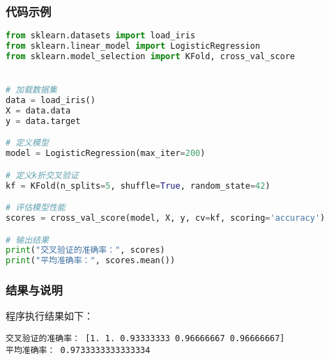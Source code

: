 \subsubsection{代码示例}
\begin{lstlisting}[language=python]
from sklearn.datasets import load_iris
from sklearn.linear_model import LogisticRegression
from sklearn.model_selection import KFold, cross_val_score


# 加载数据集
data = load_iris()
X = data.data
y = data.target

# 定义模型
model = LogisticRegression(max_iter=200)

# 定义k折交叉验证
kf = KFold(n_splits=5, shuffle=True, random_state=42)

# 评估模型性能
scores = cross_val_score(model, X, y, cv=kf, scoring='accuracy')

# 输出结果
print("交叉验证的准确率：", scores)
print("平均准确率：", scores.mean())
\end{lstlisting}


\subsubsection{结果与说明}
程序执行结果如下：
\begin{lstlisting}[language=none]
交叉验证的准确率： [1. 1. 0.93333333 0.96666667 0.96666667]
平均准确率： 0.9733333333333334
\end{lstlisting}

